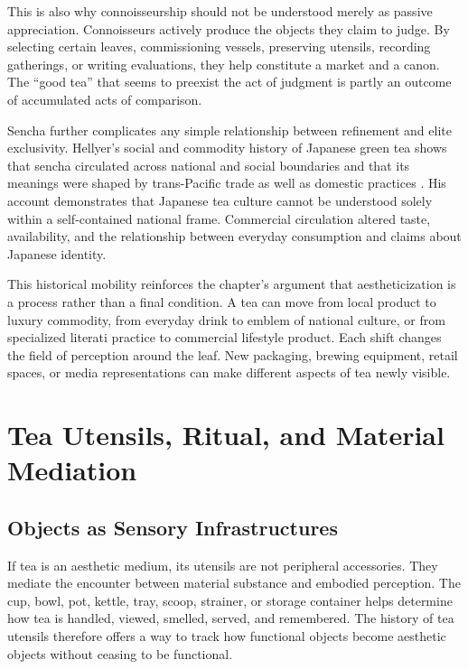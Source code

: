\documentclass[numbers]{IntechOpen-Book}
\begin{document}
This is also why connoisseurship should not be understood merely as passive appreciation. Connoisseurs actively produce the objects they claim to judge. By selecting certain leaves, commissioning vessels, preserving utensils, recording gatherings, or writing evaluations, they help constitute a market and a canon. The ``good tea'' that seems to preexist the act of judgment is partly an outcome of accumulated acts of comparison.

Sencha further complicates any simple relationship between refinement and elite exclusivity. Hellyer's social and commodity history of Japanese green tea shows that sencha circulated across national and social boundaries and that its meanings were shaped by trans-Pacific trade as well as domestic practices \cite{hellyer2021}. His account demonstrates that Japanese tea culture cannot be understood solely within a self-contained national frame. Commercial circulation altered taste, availability, and the relationship between everyday consumption and claims about Japanese identity.

This historical mobility reinforces the chapter's argument that aestheticization is a process rather than a final condition. A tea can move from local product to luxury commodity, from everyday drink to emblem of national culture, or from specialized literati practice to commercial lifestyle product. Each shift changes the field of perception around the leaf. New packaging, brewing equipment, retail spaces, or media representations can make different aspects of tea newly visible.

\section{Tea Utensils, Ritual, and Material Mediation}

\subsection{Objects as Sensory Infrastructures}

If tea is an aesthetic medium, its utensils are not peripheral accessories. They mediate the encounter between material substance and embodied perception. The cup, bowl, pot, kettle, tray, scoop, strainer, or storage container helps determine how tea is handled, viewed, smelled, served, and remembered. The history of tea utensils therefore offers a way to track how functional objects become aesthetic objects without ceasing to be functional.
\end{document}
